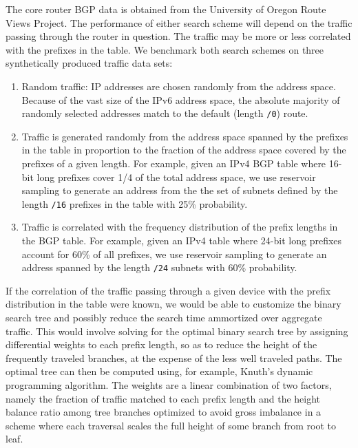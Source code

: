 \documentclass[conference,compsoc]{IEEEtran}
\begin{document}
The core router BGP data is obtained from the University of Oregon Route
Views Project.\cite{Oregon:RouteViews}
The performance of either search scheme will depend on the traffic passing
through the router in question. The traffic may be more or less correlated
with the prefixes in the table. We benchmark both search schemes on three
synthetically produced traffic data sets:

\begin{enumerate}
\item Random traffic: IP addresses are chosen randomly from the
    address space. Because of the vast size of the IPv6 address space,
    the absolute majority of randomly selected addresses match
    to the default (length \texttt{/0}) route.
\item Traffic is generated randomly from the address space spanned by the
    prefixes in the table in proportion to the fraction of the address space
    covered by the prefixes of a given length. For example, given an IPv4
    BGP table where 16-bit long prefixes cover 1/4 of the total address
    space, we use reservoir sampling to generate an address from the
    the set of subnets defined by the length \texttt{/16} prefixes
    in the table with 25\% probability.
\item Traffic is correlated with the frequency distribution of the prefix
    lengths in the BGP table. For example, given an IPv4 table where
    24-bit long prefixes account for 60\% of all prefixes, we use reservoir
    sampling to generate an address spanned by the length \texttt{/24} 
    subnets with 60\% probability.
\end{enumerate}

If the correlation of the traffic passing through a given device with
the prefix distribution in the table were known, we would be able to 
customize the binary search tree and possibly reduce the search time
ammortized over aggregate traffic.
This would involve solving for the optimal binary search tree
by assigning differential weights to each prefix length, so as to reduce the
height of the frequently traveled branches, at the expense of the less
well traveled paths. The optimal tree can then be computed using, for
example, Knuth's dynamic programming algorithm. The
weights are a linear combination of two factors, namely
the fraction of traffic matched to each prefix length and the
height balance ratio among tree branches optimized to avoid gross
imbalance in a scheme where each traversal scales the full height of some
branch from root to leaf.
\end{document}

